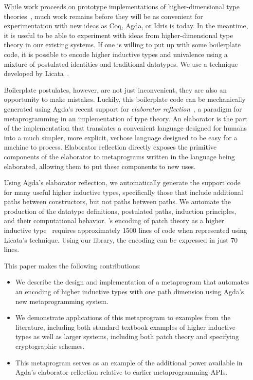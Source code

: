 \documentclass[sigplan,10pt]{acmart}
\begin{document}
While work proceeds on prototype implementations of higher-dimensional type theories~\citep{cohen, Angiuli-2017}, much work remains before they will be as convenient for experimentation with new ideas as Coq, Agda, or Idris is today.
In the meantime, it is useful to be able to experiment with ideas from higher-dimensional type theory in our existing systems.
If one is willing to put up with some boilerplate code, it is possible to encode higher inductive types and univalence using a mixture of postulated identities and traditional datatypes.
We use a technique developed by Licata~\cite{Licata-2011}.

Boilerplate postulates, however, are not just inconvenient, they are also an opportunity to make mistakes.
Luckily, this boilerplate code can be mechanically generated using Agda's recent support for \emph{elaborator reflection}~\cite{David-2016}, a paradigm for metaprogramming in an implementation of type theory.
An elaborator is the part of the implementation that translates a convenient language designed for humans into a much simpler, more explicit, verbose language designed to be easy for a machine to process.
Elaborator reflection directly exposes the primitive components of the elaborator to metaprograms written in the language being elaborated, allowing them to put these components to new uses.


Using Agda's elaborator reflection, we automatically generate the support code for many useful higher inductive types, specifically those that include additional paths between constructors, but not paths between paths. We automate the production of the datatype definitions, postulated paths, induction principles, and their computational behavior.
\citeauthor{Angiuli-2014}'s encoding of patch theory as a higher inductive type~\citep{Angiuli-2014} requires approximately 1500 lines of code when represented using Licata's technique. Using our library, the encoding can be expressed in just 70 lines.


This paper makes the following contributions:
\begin{itemize}
\item We describe the design and implementation of a metaprogram that automates an encoding of higher inductive types with one path dimension using Agda's new metaprogramming system.
\item We demonstrate applications of this metaprogram to examples from the literature, including both standard textbook examples of higher inductive types as well as larger systems, including both patch theory and specifying cryptographic schemes.
\item This metaprogram serves as an example of the additional power available in Agda's elaborator reflection relative to earlier metaprogramming APIs.
\end{itemize}
\end{document}
